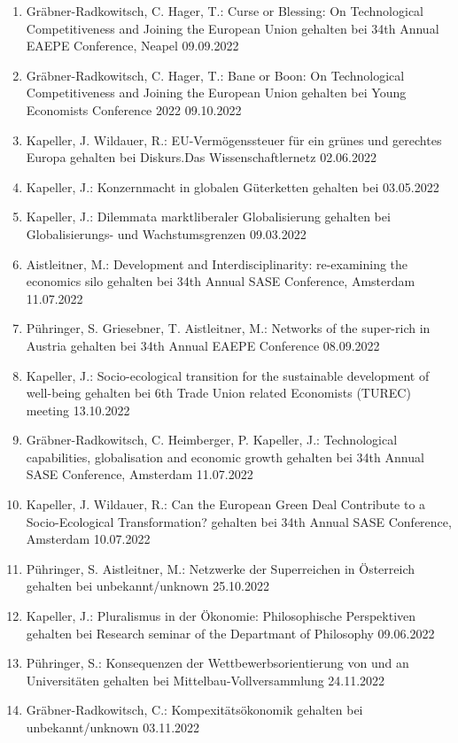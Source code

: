 \begin{enumerate}
	\item Gräbner-Radkowitsch, C. Hager, T.: Curse or Blessing: On Technological Competitiveness and Joining the European Union gehalten bei 34th Annual EAEPE Conference, Neapel 09.09.2022
	\item Gräbner-Radkowitsch, C. Hager, T.: Bane or Boon: On Technological Competitiveness and Joining the European Union gehalten bei Young Economists Conference 2022 09.10.2022
	\item Kapeller, J. Wildauer, R.: EU-Vermögenssteuer für ein grünes und gerechtes Europa gehalten bei Diskurs.Das Wissenschaftlernetz 02.06.2022
	\item Kapeller, J.: Konzernmacht in globalen Güterketten gehalten bei  03.05.2022
	\item Kapeller, J.: Dilemmata marktliberaler Globalisierung gehalten bei Globalisierungs- und Wachstumsgrenzen 09.03.2022
	\item Aistleitner, M.: Development and Interdisciplinarity: re-examining the \glqq economics silo\grqq{} gehalten bei 34th Annual SASE Conference, Amsterdam 11.07.2022
	\item Pühringer, S. Griesebner, T. Aistleitner, M.: Networks of the super-rich in Austria gehalten bei 34th Annual EAEPE Conference 08.09.2022
	\item Kapeller, J.: Socio-ecological transition for the sustainable development of well-being gehalten bei 6th Trade Union related Economists (TUREC) meeting 13.10.2022
	\item Gräbner-Radkowitsch, C. Heimberger, P. Kapeller, J.: Technological capabilities, globalisation and economic growth gehalten bei 34th Annual SASE Conference, Amsterdam 11.07.2022
	\item Kapeller, J. Wildauer, R.: Can the European Green Deal Contribute to a Socio-Ecological Transformation? gehalten bei 34th Annual SASE Conference, Amsterdam 10.07.2022
	\item Pühringer, S. Aistleitner, M.: Netzwerke der Superreichen in Österreich gehalten bei unbekannt/unknown 25.10.2022
	\item Kapeller, J.: Pluralismus in der Ökonomie: Philosophische Perspektiven gehalten bei Research seminar of the Departmant of Philosophy 09.06.2022
	\item Pühringer, S.: Konsequenzen der Wettbewerbsorientierung von und an Universitäten gehalten bei Mittelbau-Vollversammlung 24.11.2022
	\item Gräbner-Radkowitsch, C.: Kompexitätsökonomik gehalten bei unbekannt/unknown 03.11.2022

\end{enumerate}
